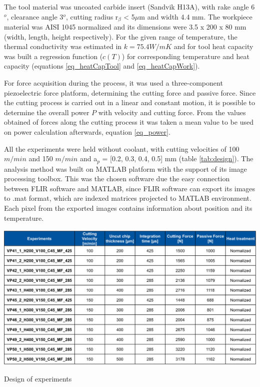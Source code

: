 	The tool material was uncoated carbide insert (Sandvik H13A), with rake angle 6$^{o}$, clearance angle 3$^{o}$, cutting radius r$_{\beta}$ < 5$\mu$m and width 4.4 mm. The workpiece material was AISI 1045 normalized and its dimensions were 3.5 x 200 x 80 mm (width, length, height respectively). For the given range of temperature, the thermal conductivity was estimated in $k = 75.4 W/mK$ and for tool heat capacity was built a regression function ($c(T)$) for corresponding temperature and heat capacity (equations \ref{eq_heatCapTool} and \ref{eq_heatCapWork}).
	
	For force acquisition during the process, it was used a three-component piezoelectric force platform, determining the cutting force and passive force. Since the cutting process is carried out in a linear and constant motion, it is possible to determine the overall power $P$ with velocity and cutting force. From the values obtained of forces along the cutting process it was taken a mean value to be used on power calculation afterwards, equation \ref{eq_power}. 
	
	All the experiments were held without coolant, with cutting velocities of 100 $m/min$ and 150 $m/min$ and a$_{p}$ = [0.2, 0.3, 0.4, 0.5] mm (table \ref{tab:design}).
	The analysis method was built on MATLAB platform with the support of its image processing toolbox. This was the chosen software due the easy connection between FLIR software and MATLAB, since FLIR software can export its images to .mat format, which are indexed matrices projected to MATLAB environment. Each pixel from the exported images contains information about position and its temperature.

	\begin{table}[H]
		\centering
		\captionsetup{justification=centering}
		\includegraphics[scale = 0.6]{Cap3/tabexpset.png}
		\caption{Design of experiments \cite{augspurger2016experimental}}
		\label{tab:design}
	\end{table}


